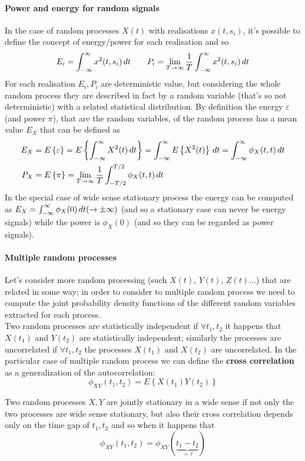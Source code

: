 	\paragraph{Power and energy for random signals} In the case of random processes $X(t)$ with realisations $x(t,s_i)$, it's possible to define the concept of energy/power for each realisation and so
	\[ E_i = \int_{-\infty}^\infty x^2(t,s_i)\, dt \qquad P_i = \lim_{T\rightarrow \infty} \frac 1 T \int_{-\infty}^\infty x^2(t,s_i)\, dt  \]
	For each realisation $E_i,P_i$ are deterministic value, but considering the whole random process they are described in fact by a random variable (that's so not deterministic) with a related statistical distribution. By definition the energy $\varepsilon$ (and power $\pi$), that are the random variables, of the random process has a  mean value $E_X$ that  can be defined as
	\begin{align*}
		E_X & = E\left\{ \varepsilon  \right\} = E\left\{ \int_{-\infty}^\infty X^2(t) \, dt \right\} = \int_{-\infty}^\infty E\left\{ X^2(t) \right\}\, dt = \int_{-\infty}^\infty \phi_X(t,t)\, dt \\ 
		P_X & = E\left\{\pi\right\} = \lim_{T\rightarrow \infty} \frac 1 T \int_{-T/2}^{T/2} \phi_X(t,t)\, dt 
	\end{align*}
	In the special case of wide sense stationary process the energy can be computed as $E_X = \int_{-\infty}^\infty \phi_X(0)\, dt (\rightarrow \pm \infty) $ (and so a stationary case can never be energy signals) while the power is $\phi_X(0)$ (and so they can be regarded as power signals).
	
	\paragraph{Multiple random processes} Let's consider more random processing (such $X(t)$, $Y(t)$, $Z(t)\dots$) that are related in some way; in order to consider to multiple random process we need to compute the joint probability density functions of the different random variables extracted for each process.\\
	Two random processes are statistically independent if $\forall t_1,t_2$ it happens that $X(t_1)$ and $Y(t_2)$ are statistically independent; similarly the processes are uncorrelated if $\forall t_1,t_2$ the processes $X(t_1)$ and $X(t_2)$ are uncorrelated. In the particular case of multiple random process we can define the \textbf{cross correlation} as a generalization of the autocorrelation:
	\[ \phi_{XY}(t_1,t_2) = E\left\{ X(t_1) Y(t_2) \right\} \]
	
	Two random processes $X,Y$ are jointly stationary in a wide sense if not only the two processes are wide sense stationary, but also their cross correlation depends only on the time gap of $t_1,t_2$ and so when it happens that
	\[ \phi_{XY}(t_1,t_2) = \phi_{XY} (\underbrace{t_1-t_2}_{=\tau}) \]
	
